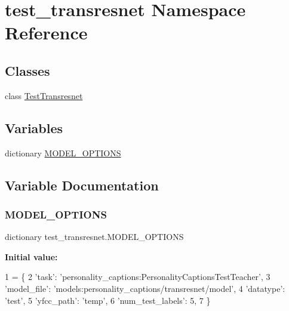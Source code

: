 \hypertarget{namespacetest__transresnet}{}\section{test\+\_\+transresnet Namespace Reference}
\label{namespacetest__transresnet}
\subsection*{Classes}
\begin{DoxyCompactItemize}
\item 
class \hyperlink{classtest__transresnet_1_1TestTransresnet}{Test\+Transresnet}
\end{DoxyCompactItemize}
\subsection*{Variables}
\begin{DoxyCompactItemize}
\item 
dictionary \hyperlink{namespacetest__transresnet_a443ec3fdb6b3da0fe5aa2f03a0b24f86}{M\+O\+D\+E\+L\+\_\+\+O\+P\+T\+I\+O\+NS}
\end{DoxyCompactItemize}


\subsection{Variable Documentation}
\mbox{\label{namespacetest__transresnet_a443ec3fdb6b3da0fe5aa2f03a0b24f86}} 
\subsubsection{\texorpdfstring{M\+O\+D\+E\+L\+\_\+\+O\+P\+T\+I\+O\+NS}{MODEL\_OPTIONS}}
{\footnotesize\ttfamily dictionary test\+\_\+transresnet.\+M\+O\+D\+E\+L\+\_\+\+O\+P\+T\+I\+O\+NS}

{\bfseries Initial value\+:}
\begin{DoxyCode}
1 =  \{
2     \textcolor{stringliteral}{'task'}: \textcolor{stringliteral}{'personality\_captions:PersonalityCaptionsTestTeacher'},
3     \textcolor{stringliteral}{'model\_file'}: \textcolor{stringliteral}{'models:personality\_captions/transresnet/model'},
4     \textcolor{stringliteral}{'datatype'}: \textcolor{stringliteral}{'test'},
5     \textcolor{stringliteral}{'yfcc\_path'}: \textcolor{stringliteral}{'temp'},
6     \textcolor{stringliteral}{'num\_test\_labels'}: 5,
7 \}
\end{DoxyCode}
